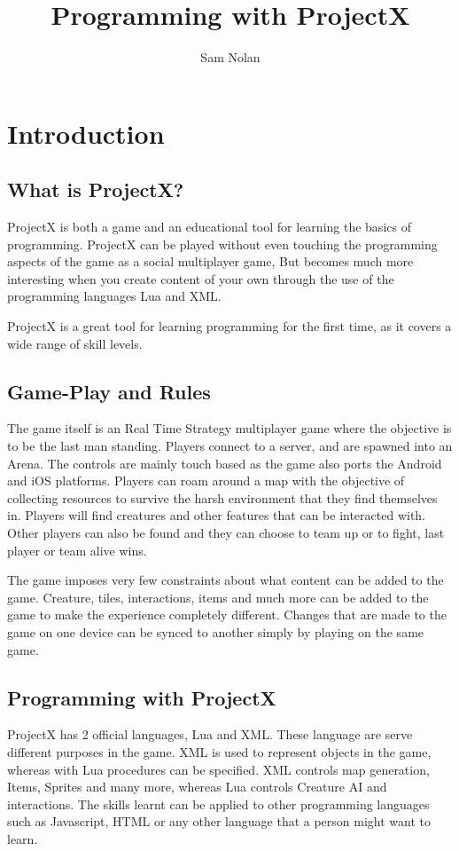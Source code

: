 \documentclass{book}
\author{Sam Nolan}
\title{Programming with ProjectX}
\begin{document}
	\maketitle
	\tableofcontents
	\chapter{Introduction}
	\section{What is ProjectX?}
	ProjectX is both a game and an educational tool for learning the basics of programming. ProjectX can be played without even touching the programming aspects of the game as a social multiplayer game, But becomes much more interesting when you create content of your own through the use of the programming languages Lua and XML.
	
	ProjectX is a great tool for learning programming for the first time, as it covers a wide range of skill levels.
	
	\section{Game-Play and Rules}
	The game itself is an Real Time Strategy multiplayer game where the objective is to be the last man standing. Players connect to a server, and are spawned into an Arena. The controls are mainly touch based as the game also ports the Android and iOS platforms. Players can roam around a map with the objective of collecting resources to survive the harsh environment that they find themselves in. Players will find creatures and other features that can be interacted with. Other players can also be found and they can choose to team up or to fight, last player or team alive wins.
	
	The game imposes very few constraints about what content can be added to the game. Creature, tiles, interactions, items and much more can be added to the game to make the experience completely different. Changes that are made to the game on one device can be synced to another simply by playing on the same game.
	
	\section{Programming with ProjectX}
	ProjectX has 2 official languages, Lua and XML. These language are serve different purposes in the game. XML is used to represent objects in the game, whereas with Lua procedures can be specified. XML controls map generation, Items, Sprites and many more, whereas Lua controls Creature AI and interactions. The skills learnt can be applied to other programming languages such as Javascript, HTML or any other language that a person might want to learn.
	
\end{document}
